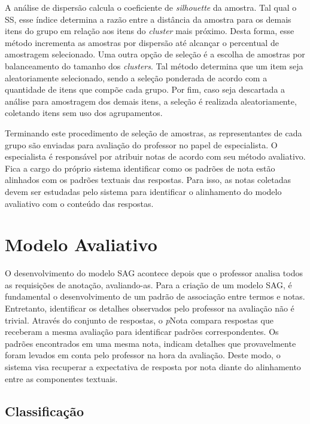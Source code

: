 A análise de dispersão calcula o coeficiente de \textit{silhouette} da amostra. Tal qual o SS, esse índice determina a razão entre a distância da amostra para os demais itens do grupo em relação aos itens do \textit{cluster} mais próximo. Desta forma, esse método incrementa as amostras por dispersão até alcançar o percentual de amostragem selecionado. Uma outra opção de seleção é a escolha de amostras por balanceamento do tamanho dos \textit{clusters}. Tal método determina que um item seja aleatoriamente selecionado, sendo a seleção ponderada de acordo com a quantidade de itens que compõe cada grupo. Por fim, caso seja descartada a análise para amostragem dos demais itens, a seleção é realizada aleatoriamente, coletando itens sem uso dos agrupamentos.

Terminando este procedimento de seleção de amostras, as representantes de cada grupo são enviadas para avaliação do professor no papel de especialista. O especialista é responsável por atribuir notas de acordo com seu método avaliativo. Fica a cargo do próprio sistema identificar como os padrões de nota estão alinhados com os padrões textuais das respostas. Para isso, as notas coletadas devem ser estudadas pelo sistema para identificar o alinhamento do modelo avaliativo com o conteúdo das respostas.

\section{Modelo Avaliativo}
\label{sec-avaliacao}

O desenvolvimento do modelo SAG acontece depois que o professor analisa todos as requisições de anotação, avaliando-as. Para a criação de um modelo SAG, é fundamental o desenvolvimento de um padrão de associação entre termos e notas. Entretanto, identificar os detalhes observados pelo professor na avaliação não é trivial. Através do conjunto de respostas, o \textit{p}Nota compara respostas que receberam a mesma avaliação para identificar padrões correspondentes. Os padrões encontrados em uma mesma nota, indicam detalhes que provavelmente foram levados em conta pelo professor na hora da avaliação. Deste modo, o sistema visa recuperar a expectativa de resposta por nota diante do alinhamento entre as componentes textuais.

\subsection{Classificação}
\label{subsec-classificacao}

